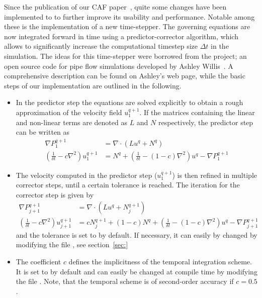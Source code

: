\documentclass[a4paper, 11pt, DIV=11]{scrartcl}
\begin{document}
Since the publication of our CAF paper~\cite{Shi2015}, quite some changes have been
implemented to \nsc to further improve its usability and performance. Notable among
these is the implementation of a new time-stepper. The governing equations are now
integrated forward in time using a predictor-corrector algorithm, which allows to
significantly increase the computational timestep size $\Delta t$ in the simulation.
The ideas for this time-stepper were borrowed from the \opf project; an open source
code for pipe flow simulations developed by Ashley Willis~\cite{Willis2017}. A
comprehensive description can be found on Ashley's web page, while the basic steps
of our implementation are outlined in the following.
\begin{itemize}

\item
In the predictor step the equations are solved explicitly to obtain a rough
approximation of the velocity field $u_1^{q+1}$. If the matrices containing
the linear and non-linear terms are denoted as $L$ and $N$ respectively, the
predictor step can be written as
\begin{align*}
\nabla P_1^{q+1} & = \nabla\cdot(Lu^q+N^q)\\
\left(\frac{1}{\delta t} - c\nabla^2\right) u_1^{q+1} & =
N^q + \left(\frac{1}{\delta t}-(1-c)\nabla^2\right) u^{q} - \nabla P_1^{q+1}
\end{align*}

\item
The velocity computed in the predictor step ($u_1^{q+1}$) is then refined in
multiple corrector steps, until a certain tolerance is reached. The iteration
for the corrector step is given by
\begin{align*}
\nabla P_{j+1}^{q+1} & = \nabla\cdot\left(Lu^q+N_j^{q+1}\right)\\
\left(\frac{1}{\delta t}-c \nabla^2\right) u_{j+1}^{q+1} & =
c N_j^{q+1} + \left(1-c\right)N^q + \left( \frac{1}{\delta t} -
\left(1-c \right) \nabla^2 \right) u^{q} - \nabla P_{j+1}^{q+1}
\end{align*}
and the tolerance is set to  by default. If
necessary, it can easily by changed by modifying the file ,
see section~\ref{sec:}

\item The coefficient $c$ defines the implicitness of the temporal integration
scheme. It is set to  by default and can easily be
changed at compile time by modifying the file . Note,
that the temporal scheme is of second-order accuracy if $c=0.5$.


\end{itemize}
\end{document}
